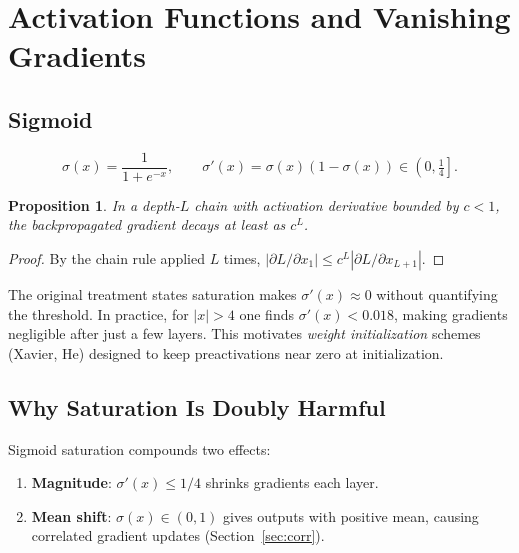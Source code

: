 \documentclass[12pt,a4paper]{article}
\newtheorem{proposition}{Proposition}[section]
\theoremstyle{definition}
\theoremstyle{remark}
\begin{document}
\section{Activation Functions and Vanishing Gradients}

\subsection{Sigmoid}

\[
\sigma(x) = \frac{1}{1+e^{-x}}, \qquad \sigma'(x) = \sigma(x)(1-\sigma(x)) \in \left(0,\tfrac{1}{4}\right].
\]

\begin{proposition}
In a depth-$L$ chain with activation derivative bounded by $c < 1$, the backpropagated gradient decays at least as $c^L$.
\end{proposition}

\begin{proof}
By the chain rule applied $L$ times,
$\left|\partial L/\partial x_1\right| \le c^L \left|\partial L/\partial x_{L+1}\right|.$
\end{proof}

\begin{critbox}
The original treatment states saturation makes $\sigma'(x) \approx 0$ without quantifying the threshold. In practice, for $|x| > 4$ one finds $\sigma'(x) < 0.018$, making gradients negligible after just a few layers. This motivates \emph{weight initialization} schemes (Xavier, He) designed to keep preactivations near zero at initialization.
\end{critbox}

\subsection{Why Saturation Is Doubly Harmful}

Sigmoid saturation compounds two effects:
\begin{enumerate}
    \item \textbf{Magnitude}: $\sigma'(x) \le 1/4$ shrinks gradients each layer.
    \item \textbf{Mean shift}: $\sigma(x) \in (0,1)$ gives outputs with positive mean, causing correlated gradient updates (Section~\ref{sec:corr}).
\end{enumerate}

\end{document}
